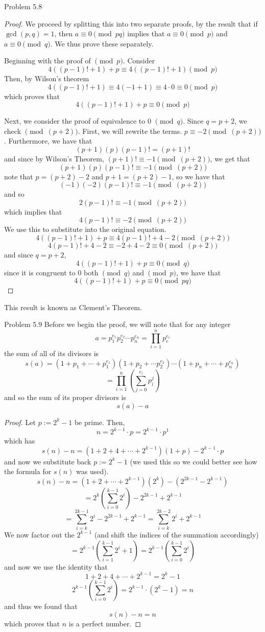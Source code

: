 \begin{sol}{Problem 5.8}
\begin{proof}
We proceed by splitting this into two separate proofs, by the result that if $\gcd(p,q) = 1$, then $a \equiv 0 \pmod{pq}$ implies that $a \equiv 0 \pmod{p}$ and $a \equiv 0 \pmod{q}$. We thus prove these separately.

Beginning with the proof of $\pmod{p}$. Consider
\[
4((p-1)!+1)+p \equiv 4((p-1)!+1) \pmod{p}
\]
Then, by Wilson's theorem
\[
4((p-1)!+1) \equiv 4(-1+1) \equiv 4 \cdot 0 \equiv 0 \pmod{p}
\]
which proves that
\[
4((p-1)!+1)+p \equiv 0 \pmod{p}
\]

Next, we consider the proof of equivalence to 0 $\pmod{q}$. Since $q = p+2$, we check $\pmod{(p+2)}$. First, we will rewrite the terms. $p \equiv -2 \pmod{(p+2)}$. Furthermore, we have that
\[
(p+1)(p)(p-1)! = (p+1)!
\]
and since by Wilson's Theorem, $(p+1)! \equiv -1 \pmod{(p+2)}$, we get that
\[
(p+1)(p)(p-1)! \equiv -1 \pmod{(p+2)}
\]
note that $p = (p+2)-2$ and $p+1 = (p+2)-1$, so we have that
\[
(-1)(-2)(p-1)! \equiv -1 \pmod{(p+2)}
\]
and so 
\[
2 (p-1)! \equiv -1 \pmod{(p+2)}
\]
which implies that
\[
4 (p-1)! \equiv -2 \pmod{(p+2)}
\]
We use this to substitute into the original equation.
\[
4((p-1)! + 1) + p \equiv 4(p-1)! + 4 -2 \pmod{(p+2)}
\]
\[
4(p-1)! + 4 -2 \equiv -2 + 4 -2 \equiv 0\pmod{(p+2)} 
\]
and since $q = p+2$,
\[
4((p-1)! + 1) + p \equiv 0 \pmod{q}
\]
since it is congruent to 0 both $\pmod{q}$ and $\pmod{p}$, we have that
\[
4((p-1)! + 1) + p \equiv 0 \pmod{pq}
\]
\end{proof}
This result is known as Clement's Theorem.
\end{sol}

\begin{sol}{Problem 5.9}
Before we begin the proof, we will note that for any integer 
\[
a = p_1^{e_1}p_2^{e_2}\cdots p_n^{e_n} = \prod_{i=1}^{n}p_e^{e_i}
\]
the sum of all of its divisors is 
\[
s(a) = (1 + p_1  + \cdots + p_1^{e_1})(1 + p_2  + \cdots p_2^{e_2}) \cdots (1 + p_n + \cdots + p_n^{e_n})
\]
\[
= \prod_{i=1}^{n}{\left(\sum_{j=0}^{e_i}{p_i^j}\right)}
\]
and so the sum of its proper divisors is 
\[
s(a) - a
\]
\begin{proof}
Let $p := 2^k - 1$ be prime. Then, 
\[
n = 2^{k-1} \cdot p = 2^{k-1} \cdot p^1
\]
which has 
\[
s(n)-n = (1 + 2 + 4 + \cdots + 2^{k-1})(1 + p) - 2^{k-1} \cdot p
\]
and now we substitute back $p := 2^k - 1$ (we used this so we could better see how the formula for $s(n)$ was used). 
\[
s(n) - n = (1 + 2 + \cdots + 2^{k-1})(2^k) - (2^{2k-1} - 2^{k-1}) 
\]
\[
= 2^k \left(\sum_{i=0}^{k-1}{2^i}\right) - 2^{2k-1} + 2^{k-1}
\]
\[
= \sum_{i=k}^{2k-1} {2^i}- 2^{2k-1} + 2^{k-1} =  \sum_{i=k}^{2k-2} {2^i} + 2^{k-1}
\]
We now factor out the $2^{k-1}$ (and shift the indices of the summation accordingly)
\[
= 2^{k-1}\left(  \sum_{i=1}^{k-1}{2^i} + 1 \right) = 2^{k-1}\left(  \sum_{i=0}^{k-1}{2^i}\right)
\]
and now we use the identity that
\[
1 + 2 + 4 + \cdots + 2^{k-1} = 2^k -1
\]
\[
2^{k-1}\left(  \sum_{i=0}^{k-1}{2^i}\right) = 2^{k-1} \cdot (2^k-1) = n
\]
and thus we found that
\[
s(n)-n=n
\]
which proves that $n$ is a perfect number.
\end{proof}
\end{sol}

